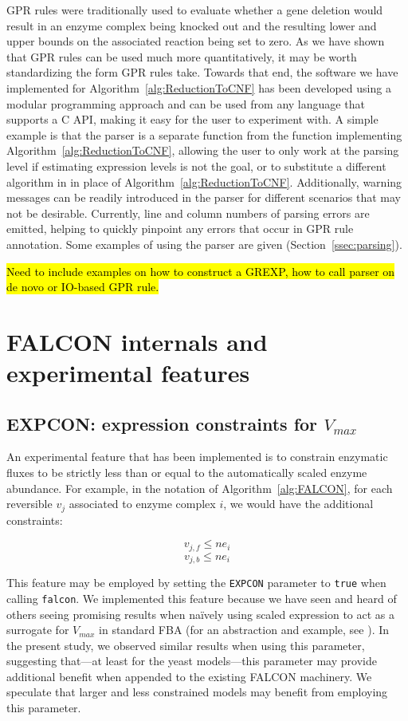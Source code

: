 GPR rules were traditionally used to evaluate whether a gene deletion
would result in an enzyme complex being knocked out and the resulting
lower and upper bounds on the associated reaction being set to
zero. As we have shown that GPR rules can be used much more
quantitatively, it may be worth standardizing the form GPR rules
take. Towards that end, the software we have implemented for
Algorithm~\ref{alg:ReductionToCNF} has been developed using a modular
programming approach and can be used from any language that supports
a C API, making it easy for the user to experiment
with. A simple example is that the parser is a separate function from
the function implementing Algorithm~\ref{alg:ReductionToCNF}, allowing
the user to only work at the parsing level if estimating expression
levels is not the goal, or to substitute a different algorithm in in
place of Algorithm~\ref{alg:ReductionToCNF}. Additionally, warning
messages can be readily introduced in the parser for different
scenarios that may not be desirable. Currently, line and column
numbers of parsing errors are emitted, helping to quickly pinpoint any
errors that occur in GPR rule annotation. Some examples of using
the parser are given (\suppOrApp Section~\ref{ssec:parsing}).

\hl{Need to include examples on how to construct a GREXP, how to call
parser on de novo or IO-based GPR rule.}


\section{FALCON internals and experimental features}
\label{sec:internals}

\subsection{EXPCON: expression constraints for $V_{max}$}
An experimental feature that has been implemented is to constrain
enzymatic fluxes to be strictly less than or equal to the
automatically scaled enzyme abundance. For example, in the
notation of Algorithm~\ref{alg:FALCON}, for each reversible $v_j$
associated to enzyme complex $i$, we would have the additional
constraints:

\[ v_{j,f} \leq n e_i \]
\[ v_{j,b} \leq n e_i \]

This feature may be employed by setting the \texttt{EXPCON} parameter
to \texttt{true} when calling \texttt{falcon}. We implemented this
feature because we have seen and heard of others seeing promising
results when na\"ively using scaled expression to act as a surrogate for
$V_{max}$ in standard FBA (for an abstraction and example, see
\citealt{Colijn2009}). In the present study, we observed similar
results when using this parameter, suggesting that---at least for the
yeast models---this parameter may provide additional benefit when
appended to the existing FALCON machinery. We speculate that larger
and less constrained models may benefit from employing this parameter.

